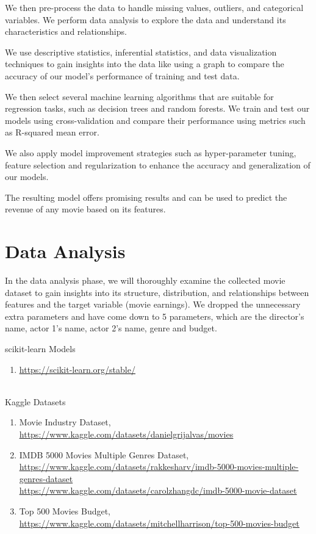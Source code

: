 \documentclass[conference]{IEEEtran}
\begin{document}
        We then pre-process the data to handle missing values, outliers, and categorical variables. We perform data analysis to explore the data and understand its characteristics and relationships.
        
        We use descriptive statistics, inferential statistics, and data visualization techniques to gain insights into the data like using a graph to compare the accuracy of our model's performance of training and test data.
        
        We then select several machine learning algorithms that are suitable for regression tasks, such as decision trees and random forests.
        We train and test our models using cross-validation and compare their performance using metrics such as R-squared mean error.
        
        We also apply model improvement strategies such as hyper-parameter tuning, feature selection and regularization to enhance the accuracy and generalization of our models.
        
        The resulting model offers promising results and can be used to predict the revenue of any movie based on its features.

\section{Data Analysis}
    In the data analysis phase, we will thoroughly examine the collected movie dataset to gain insights into its structure, distribution, and relationships between features and the target variable (movie earnings). We dropped the unnecessary extra parameters and have come down to 5 parameters, which are the director's name, actor 1's name, actor 2's name, genre and budget.

\begin{thebibliography}{1}
     scikit-learn Models
        \begin{enumerate}
            \item \underline{\url{https://scikit-learn.org/stable/}}
        \end{enumerate}
\\
     Kaggle Datasets
        \begin{enumerate}
            \item Movie Industry Dataset, \\
            \underline{\url{https://www.kaggle.com/datasets/danielgrijalvas/movies}}
\\
            \item IMDB 5000 Movies Multiple Genres Dataset, \\
            \underline{\url{https://www.kaggle.com/datasets/rakkesharv/imdb-5000-movies-multiple-genres-dataset}} \\
            \underline{\url{https://www.kaggle.com/datasets/carolzhangdc/imdb-5000-movie-dataset}}
\\
            \item Top 500 Movies Budget, \\
            \underline{\url{https://www.kaggle.com/datasets/mitchellharrison/top-500-movies-budget}}
        \end{enumerate}
\end{thebibliography}
\end{document}

